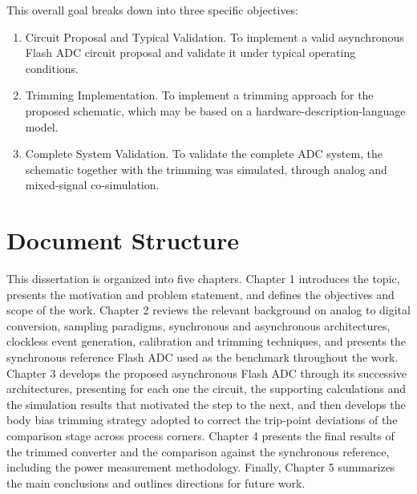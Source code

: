 This overall goal breaks down into three specific objectives:

\begin{enumerate}
  \item Circuit Proposal and Typical Validation. To implement a valid asynchronous Flash ADC circuit proposal and validate it under typical operating conditions.

  \item Trimming Implementation. To implement a trimming approach for the proposed schematic, which may be based on a hardware-description-language model.

  \item Complete System Validation. To validate the complete ADC system, the schematic together with the trimming was simulated, through analog and mixed-signal co-simulation.
\end{enumerate}
\section{Document Structure} \label{sec:document_structure}

This dissertation is organized into five chapters. Chapter 1 introduces the topic, presents the motivation and problem statement, and defines the objectives and scope of the work. Chapter 2 reviews the relevant background on analog to digital conversion, sampling paradigms, synchronous and asynchronous architectures, clockless event generation, calibration and trimming techniques, and presents the synchronous reference Flash ADC used as the benchmark throughout the work. Chapter 3 develops the proposed asynchronous Flash ADC through its successive architectures, presenting for each one the circuit, the supporting calculations and the simulation results that motivated the step to the next, and then develops the body bias trimming strategy adopted to correct the trip-point deviations of the comparison stage across process corners. Chapter 4 presents the final results of the trimmed converter and the comparison against the synchronous reference, including the power measurement methodology. Finally, Chapter 5 summarizes the main conclusions and outlines directions for future work.












